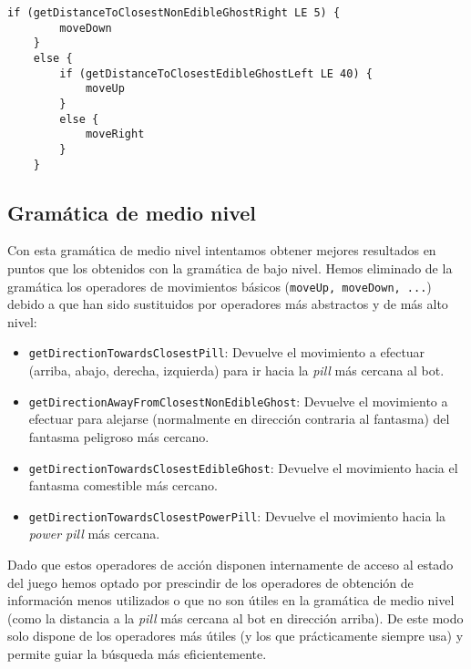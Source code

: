 \begin{lstlisting}[frame=single, breaklines=no, basicstyle=\fontsize{10}{11}\ttfamily, caption={Mejor individuo producido usando la gramática de bajo nivel evolucionado jugando contra Legacy Ghosts.}, captionpos=b]
    if (getDistanceToClosestNonEdibleGhostRight LE 5) {
        moveDown
    }
    else {
        if (getDistanceToClosestEdibleGhostLeft LE 40) {
            moveUp
        }
        else {
            moveRight
        }
    }
\end{lstlisting}

\subsection{Gramática de medio nivel}
Con esta gramática de medio nivel intentamos obtener mejores resultados en puntos que los obtenidos con la gramática de bajo nivel. Hemos eliminado de la gramática los operadores de movimientos básicos (\texttt{moveUp, moveDown, ...}) debido a que han sido sustituidos por operadores más abstractos y de más alto nivel:
\begin{itemize}
\item \texttt{getDirectionTowardsClosestPill}: Devuelve el movimiento a efectuar (arriba, abajo, derecha, izquierda) para ir hacia la \textit{pill} más cercana al bot.

\item \texttt{getDirectionAwayFromClosestNonEdibleGhost}: Devuelve el movimiento a efectuar para alejarse (normalmente en dirección contraria al fantasma) del fantasma peligroso más cercano.

\item \texttt{getDirectionTowardsClosestEdibleGhost}: Devuelve el movimiento hacia el fantasma comestible más cercano.

\item \texttt{getDirectionTowardsClosestPowerPill}: Devuelve el movimiento hacia la \textit{power pill} más cercana.
\end{itemize}

Dado que estos operadores de acción disponen internamente de acceso al estado del juego hemos optado por prescindir de los operadores de obtención de información menos utilizados o que no son útiles en la gramática de medio nivel (como la distancia a la \textit{pill} más cercana al bot en dirección arriba). De este modo solo dispone de los operadores más útiles (y los que prácticamente siempre usa) y permite guiar la búsqueda más eficientemente.

